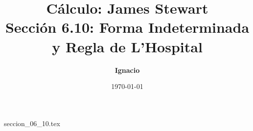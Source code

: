 \documentclass[11pt,spanish,oneside]{report}
\title{\textbf{Cálculo: James Stewart} \\ \Large Sección 6.10: Forma Indeterminada y Regla de L'Hospital}
\author{\textbf{Ignacio}}
\date{\today}
\begin{document}
\maketitle

{seccion_06_10.tex}
\end{document}
